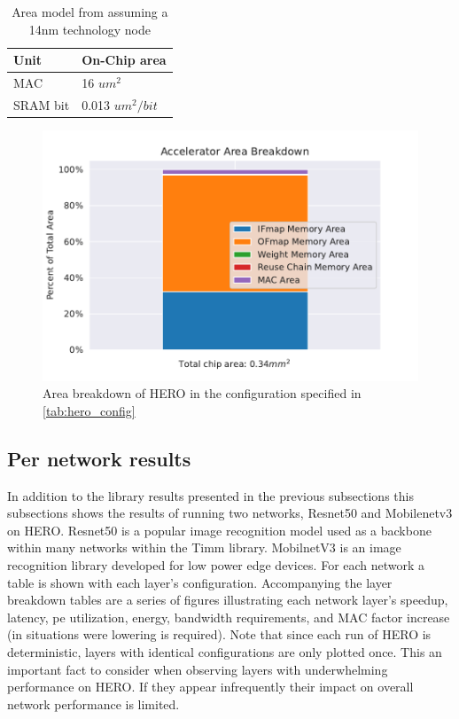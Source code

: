 \begin{table}[]
    \center
    \begin{tabular}{|l|l|}
    \toprule
    Unit & On-Chip area    \\ 
    \midrule
    MAC             &  16 $um^2$ \\
    SRAM bit      &  0.013 $um^2/bit$ \\
    \bottomrule
\end{tabular}
\caption{Area model from \cite{area_model} assuming a 14nm technology node}
\label{tab:area_model_table}
\end{table}


\begin{figure}[ht]
    \centering
    \includegraphics[scale=0.58]{Plots/resources/area.pdf}
    \caption{Area breakdown of HERO in the configuration specified in \autoref{tab:hero_config}}
    \label{fig:area_breakdown}
\end{figure}


\subsection{Per network results}
\label{chap:hero:results:network}

In addition to the library results presented in the previous subsections this
subsections shows the results of running two networks, Resnet50 and Mobilenetv3
on HERO. Resnet50 is a popular image recognition model used as a backbone within
many networks within the Timm library. MobilnetV3 is an image recognition
library developed for low power edge devices. For each network a table is shown
with each layer's configuration. Accompanying the layer breakdown tables are a
series of figures illustrating each network layer's speedup, latency, pe utilization,
energy, bandwidth requirements, and MAC factor increase (in situations were
lowering is required). Note that since each run of HERO is deterministic, layers
with identical configurations are only plotted once. This an important fact to
consider when observing layers with underwhelming performance on HERO. If they
appear infrequently their impact on overall network performance is limited. 

